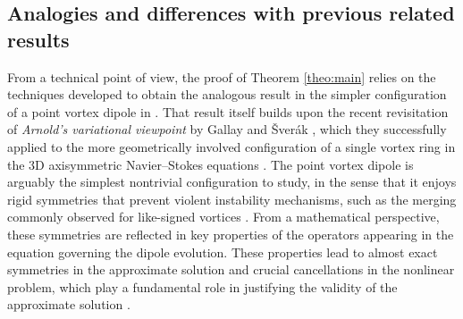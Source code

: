 \documentclass[11pt,reqno,a4paper]{amsart}
\newcommand{\1}{\mathbbm{1}}
\theoremstyle{definition}
\theoremstyle{definition}
\numberwithin{equation}{section}
\begin{document}
\subsection{Analogies and differences with previous related results}
From a technical point of view, the proof of Theorem \ref{theo:main} relies on the techniques developed to obtain the analogous result in the simpler configuration of a point vortex dipole in \cite{dolce2024long}.  That result itself builds upon the recent revisitation of \emph{Arnold's variational viewpoint} by Gallay and \v{S}ver\'ak \cite{GaSarnold}, which they successfully applied to the more geometrically involved configuration of a single vortex ring in the 3D axisymmetric Navier--Stokes equations \cite{GaSring}. The point vortex dipole is arguably the simplest nontrivial configuration to study, in the sense that it enjoys rigid symmetries that prevent violent instability mechanisms, such as the merging commonly observed for like-signed vortices \cite{Meunier2005}. From a mathematical perspective, these symmetries are reflected in key properties of the operators appearing in the equation governing the dipole evolution. These properties lead to almost exact symmetries in the approximate solution and crucial cancellations in the nonlinear problem, which play a fundamental role in justifying the validity of the approximate solution \cite{dolce2024long}.
\end{document}
